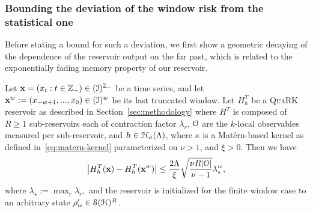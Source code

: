 \subsubsection{Bounding the deviation of the window risk from the statistical one}
Before stating a bound for such a deviation, we first show a geometric decaying of the dependence of the reservoir output on the far past, which is related to the exponentially fading memory property of our reservoir.
\begin{proposition}\label{prop:geometric-decay}
    Let ${\mathbf{x}} = (x_t : t\in {\mathbb{Z}}_-) \in ({\mathcal{I}})^{{\mathbb{Z}}_-}$ be a time series, and let ${\mathbf{x}}^w : = (x_{-w + 1}, ..., x_0) \in ({\mathcal{I}})^w$ be its last truncated window. Let $H^T_h$ be a \textsc{QuaRK} reservoir as described in Section~\ref{sec:methodology} where $H^T$ is composed of $R \geq 1$ sub-reservoirs each of contraction factor $\lambda_r$, ${\mathcal{O}}$ are the $k$-local observables measured per sub-reservoir, and $h \in {\mathcal{H}}_{\kappa}(\Lambda)$, where $\kappa$ is a Mat\'ern-based kernel as defined in~\cref{eq:matern-kernel} parameterized on $\nu > 1$, and $\xi > 0$. Then we have
    \begin{equation}
        \left| H^T_h({\mathbf{x}}) - H^T_h({\mathbf{x}}^w) \right| \leq \frac{2 \Lambda}{\xi} \sqrt{\frac{\nu R |{\mathcal{O}}|}{\nu - 1}} \lambda_\star^w,
    \end{equation}
    where $\lambda_\star := \max_r \lambda_r,$ and the reservoir is initialized for the finite window case to an arbitrary state $\rho'_w \in {\mathcal{S}}({\mathcal{H}})^R$.
\end{proposition}
